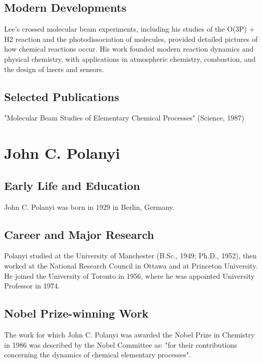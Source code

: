 \subsection*{Modern Developments}

Lee's crossed molecular beam experiments, including his studies of the O(3P) + H2 reaction and the photodissociation of molecules, provided detailed pictures of how chemical reactions occur. His work founded modern reaction dynamics and physical chemistry, with applications in atmospheric chemistry, combustion, and the design of lasers and sensors.

\subsection*{Selected Publications}

"Molecular Beam Studies of Elementary Chemical Processes" (Science, 1987)

\clearpage

\section{John C. Polanyi}

\subsection*{Early Life and Education}

John C. Polanyi was born in 1929 in Berlin, Germany.

\subsection*{Career and Major Research}

Polanyi studied at the University of Manchester (B.Sc., 1949; Ph.D., 1952), then worked at the National Research Council in Ottawa and at Princeton University. He joined the University of Toronto in 1956, where he was appointed University Professor in 1974.

\subsection*{Nobel Prize-winning Work}

The work for which John C. Polanyi was awarded the Nobel Prize in Chemistry in 1986 was described by the Nobel Committee as: "for their contributions concerning the dynamics of chemical elementary processes".

